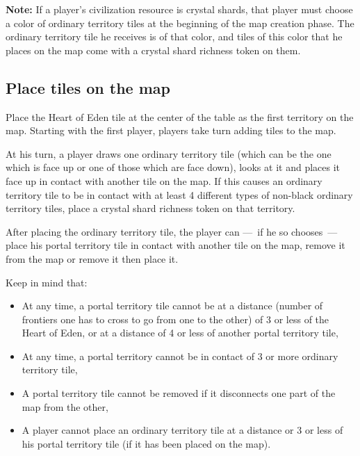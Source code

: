\documentclass[a4paper]{article}
\begin{document}
        \textbf{Note:} If a player's civilization resource is crystal shards,
        that player must choose a color of ordinary territory tiles
        at the beginning of the map creation phase.
        The ordinary territory tile he receives is of that color,
        and tiles of this color that he places on the map come with
        a crystal shard richness token on them.
      
    \subsection{Place tiles on the map}
        Place the Heart of Eden tile at the center of the table as the first
        territory on the map.
        Starting with the first player, players take turn adding tiles to the map.
        
        At his turn, a player draws one ordinary territory tile
        (which can be the one which is face up or one of those which are face down),
        looks at it and places it face up in contact with another tile on the map.
        If this causes an ordinary territory tile to be in contact with at least
        4 different types of non-black ordinary territory tiles,
        place a crystal shard richness token on that territory.
        
        After placing the ordinary territory tile, the player can ---~if he so chooses~---
        place his portal territory tile in contact with another tile on the map,
        remove it from the map or remove it then place it.
        
\newpage
        Keep in mind that:
        \vspace{-1.3em}
        \begin{itemize}
            \item At any time, a portal territory tile cannot be at a distance
                (number of frontiers one has to cross to go from one to the other)
                of 3 or less of the Heart of Eden,
                or at a distance of 4 or less of another portal territory tile,
            \item At any time, a portal territory cannot be in contact of 3 or more
                ordinary territory tile,
            \item A portal territory tile cannot be removed
                if it disconnects one part of the map from the other,
            \item A player cannot place an ordinary territory tile at a distance
                or 3 or less of his portal territory tile (if it has been placed on the map).
        \end{itemize}
        
\end{document}
